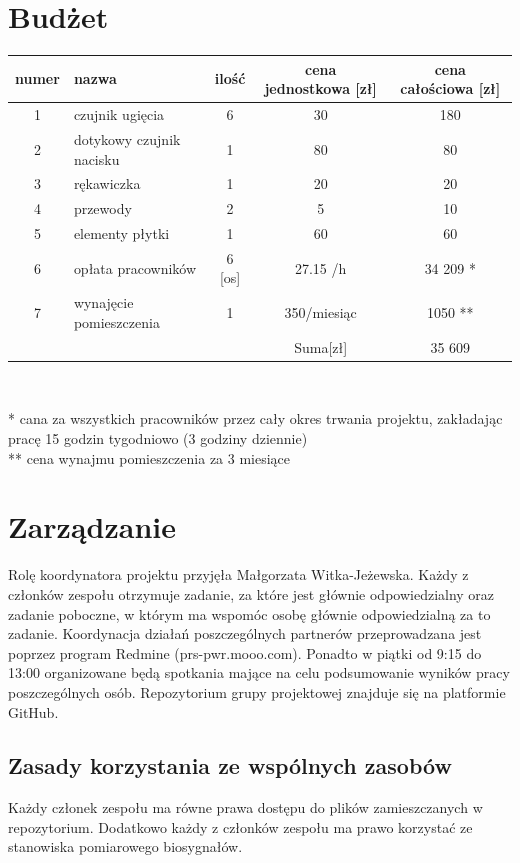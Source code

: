 \documentclass{article}
\begin{document}
\section{Budżet}
\begin{center}
\begin{tabular}{|c|l|c|c|c|} \hline
    numer & nazwa & ilość & cena jednostkowa [zł] & cena całościowa [zł] \\ \hline
    1 & czujnik ugięcia & 6 & 30 & 180 \\
    2 & dotykowy czujnik nacisku & 1 & 80 & 80 \\
    3 & rękawiczka & 1 & 20 & 20 \\
    4 & przewody & 2 & 5 & 10 \\
    5 & elementy płytki & 1 & 60 & 60\\
    6 & opłata pracowników & 6 [os] & 27.15 /h & 34 209 *\\
    7 & wynajęcie pomieszczenia & 1 & 350/miesiąc & 1050 ** \\\hline
    \hline
    & & & Suma[zł] & 35 609\\
    \hline
\end{tabular}\\
\vspace{3mm}
\end{center}
* cana za wszystkich pracowników przez cały okres trwania projektu, zakładając pracę 15 godzin tygodniowo (3 godziny dziennie)\\
** cena wynajmu pomieszczenia za 3 miesiące


\section{Zarządzanie}
Rolę koordynatora projektu przyjęła Małgorzata Witka-Jeżewska. Każdy z członków zespołu otrzymuje zadanie, za które jest głównie odpowiedzialny oraz zadanie poboczne, w którym ma wspomóc osobę głównie odpowiedzialną za to zadanie. Koordynacja działań poszczególnych partnerów przeprowadzana jest poprzez program Redmine (prs-pwr.mooo.com). Ponadto w piątki od 9:15 do 13:00 organizowane będą spotkania mające na celu podsumowanie wyników pracy poszczególnych osób. Repozytorium grupy projektowej znajduje się na platformie GitHub.
\subsection{Zasady korzystania ze wspólnych zasobów}
Każdy członek zespołu ma równe prawa dostępu do plików zamieszczanych w repozytorium. Dodatkowo każdy z członków zespołu ma prawo korzystać ze stanowiska pomiarowego biosygnałów.
\end{document}
